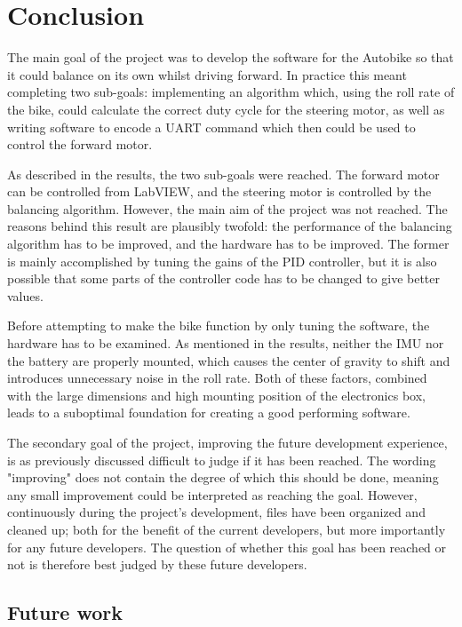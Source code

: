\chapter{Conclusion}

The main goal of the project was to develop the software for the Autobike so that it could balance on its own whilst driving forward. In practice this meant completing two sub-goals: implementing an algorithm which, using the roll rate of the bike, could calculate the correct duty cycle for the steering motor, as well as writing software to encode a UART command which then could be used to control the forward motor.

As described in the results, the two sub-goals were reached. The forward motor can be controlled from LabVIEW, and the steering motor is controlled by the balancing algorithm. However, the main aim of the project was not reached. The reasons behind this result are plausibly twofold: the performance of the balancing algorithm has to be improved, and the hardware has to be improved. The former is mainly accomplished by tuning the gains of the PID controller, but it is also possible that some parts of the controller code has to be changed to give better values. 

Before attempting to make the bike function by only tuning the software, the hardware has to be examined. As mentioned in the results, neither the IMU nor the battery are properly mounted, which causes the center of gravity to shift and introduces unnecessary noise in the roll rate. Both of these factors, combined with the large dimensions and high mounting position of the electronics box, leads to a suboptimal foundation for creating a good performing software.

The secondary goal of the project, improving the future development experience, is as previously discussed difficult to judge if it has been reached. The wording "improving" does not contain the degree of which this should be done, meaning any small improvement could be interpreted as reaching the goal. However, continuously during the project's development, files have been organized and cleaned up; both for the benefit of the current developers, but more importantly for any future developers. The question of whether this goal has been reached or not is therefore best judged by these future developers.

\section{Future work}

